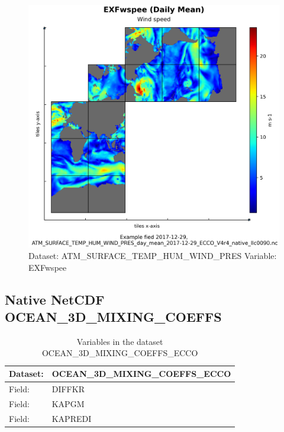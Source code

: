 \begin{figure}[H]
\centering
\includegraphics[width=\textwidth]{../images/plots/native_plots/Atmosphere_Surface_Temperature_Humidity_Wind_and_Pressure/EXFwspee.png}
\caption{Dataset: ATM\_SURFACE\_TEMP\_HUM\_WIND\_PRES Variable: EXFwspee}
\label{tab:table-ATM_SURFACE_TEMP_HUM_WIND_PRES_EXFwspee-Plot}
\end{figure}
\pagebreak
\subsection{Native NetCDF OCEAN\_3D\_MIXING\_COEFFS}
\newp
\begin{longtable}{|p{}|p{}|}
\caption{Variables in the dataset OCEAN\_3D\_MIXING\_COEFFS\_ECCO}
\label{tab:table-OCEAN_3D_MIXING_COEFFS_ECCO-fields} \\ 
\hline \endhead \hline \endfoot
\rowcolor{lightgray} \textbf{Dataset:} & \textbf{OCEAN\_3D\_MIXING\_COEFFS\_ECCO} \\ \hline
Field: &DIFFKR \\ \hline
Field: &KAPGM \\ \hline
Field: &KAPREDI \\ \hline
\end{longtable}

\pagebreak
